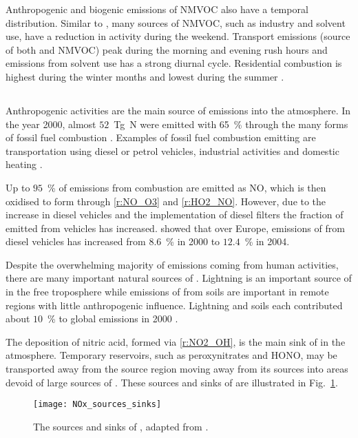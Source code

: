 Anthropogenic and biogenic emissions of NMVOC also have a temporal distribution.
Similar to , many sources of NMVOC, such as industry and solvent use, have a reduction in activity during the weekend.
Transport emissions (source of both  and NMVOC) peak during the morning and evening rush hours and emissions from solvent use has a strong diurnal cycle.
Residential combustion is highest during the winter months and lowest during the summer \citep{Gon:2011}.

\subsection[NOx]{}
Anthropogenic activities are the main source of  emissions into the atmosphere.
In the year 2000, almost $52$~Tg~N were emitted with 65~\% through the many forms of fossil fuel combustion \citep{Seinfeld:2006}. 
Examples of fossil fuel combustion emitting  are transportation using diesel or petrol vehicles, industrial activities and domestic heating \citep{vonSchneidemesser:2015}.

Up to $95$~\% of  emissions from combustion are emitted as NO, which is then oxidised to form  through \eqref{r:NO_O3} and \eqref{r:HO2_NO}.
However, due to the increase in diesel vehicles and the implementation of diesel filters the fraction of emitted  from vehicles has increased.
\citet{Grice:2009} showed that over Europe, emissions of  from diesel vehicles has increased from $8.6$~\% in 2000 to $12.4$~\% in 2004.

Despite the overwhelming majority of  emissions coming from human activities, there are many important natural sources of .
Lightning is an important source of  in the free troposphere while emissions of  from soils are important in remote regions with little anthropogenic influence.
Lightning and soils each contributed about $10$~\% to global  emissions in 2000 \citep{Seinfeld:2006}.

The deposition of nitric acid, formed via \eqref{r:NO2_OH}, is the main sink of  in the atmosphere.
Temporary reservoirs, such as peroxynitrates and HONO, may be transported away from the source region moving  away from its sources into areas devoid of large sources of .
These sources and sinks of  are illustrated in Fig.~\ref{f:NOx_sources_sinks}.
\begin{figure}[t]
	\begin{center}
        \caption[ sources and sinks]{The sources and sinks of , adapted from \citet{Seinfeld:2006}.}
        \texttt{[image: NOx\_sources\_sinks]}
        \label{f:NOx_sources_sinks}
	\end{center}
\end{figure}

